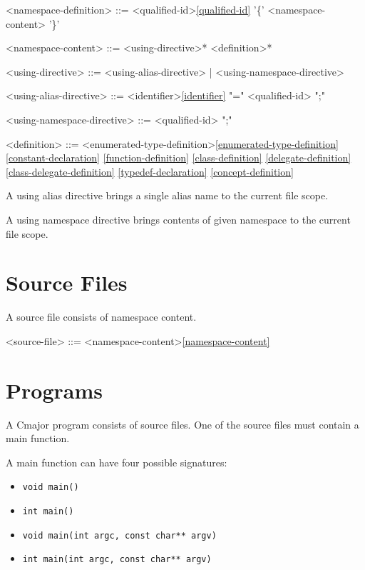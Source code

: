 \documentclass[a4paper,oneside,11pt]{article}
\begin{document}
\begin{grammar}
\label{namespace-definition}<namespace-definition> ::=  <qualified-id>\ref{qualified-id} '\{' <namespace-content> '\}'

\label{namespace-content}<namespace-content> ::= <using-directive>* <definition>*

<using-directive> ::= <using-alias-directive> | <using-namespace-directive>

<using-alias-directive> ::=  <identifier>\ref{identifier} "=" <qualified-id> ";"

<using-namespace-directive> ::=  <qualified-id> ";"

<definition> ::= <enumerated-type-definition>\ref{enumerated-type-definition}
\ref{constant-declaration}
\ref{function-definition}
\ref{class-definition}
\ref{delegate-definition}
\ref{class-delegate-definition}
\ref{typedef-declaration}
\ref{concept-definition}
\end{grammar}

A using alias directive brings a single alias name to the current file scope.

A using namespace directive brings contents of given namespace to the current file scope.

\section{Source Files}

A source file consists of namespace content.

\begin{grammar}
<source-file> ::= <namespace-content>\ref{namespace-content}
\end{grammar}

\section{Programs}

A Cmajor program consists of source files.
One of the source files must contain a main function.

A main function can have four possible signatures:

\begin{itemize}
\item \texttt{void main()}
\item \texttt{int main()}
\item \texttt{void main(int argc, const char** argv)}
\item \texttt{int main(int argc, const char** argv)}
\end{itemize}
\end{document}

